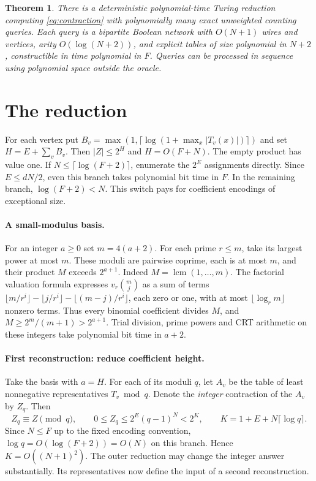 \documentclass[11pt]{article}
\newtheorem{theorem}{Theorem}
\begin{document}
\begin{theorem}\label{thm:reduction}
There is a deterministic polynomial-time Turing reduction computing \eqref{eq:contraction} with polynomially many exact unweighted counting queries. Each query is a bipartite Boolean network with $O(N+1)$ wires and vertices, arity $O(\log(N+2))$, and explicit tables of size polynomial in $N+2$, constructible in time polynomial in $F$. Queries can be processed in sequence using polynomial space outside the oracle.
\end{theorem}

\section{The reduction}
For each vertex put $B_v=\max(1,\lceil\log(1+\max_x |T_v(x)|)\rceil)$ and set $H=E+\sum_v B_v$. Then $|Z|\le 2^H$ and $H=O(F+N)$. The empty product has value one. If $N\le\lceil\log(F+2)\rceil$, enumerate the $2^E$ assignments directly. Since $E\le dN/2$, even this branch takes polynomial bit time in $F$. In the remaining branch, $\log(F+2)<N$. This switch pays for coefficient encodings of exceptional size.

\paragraph{A small-modulus basis.}
For an integer $a\ge 0$ set $m=4(a+2)$. For each prime $r\le m$, take its largest power at most $m$. These moduli are pairwise coprime, each is at most $m$, and their product $M$ exceeds $2^{a+1}$. Indeed $M=\operatorname{lcm}(1,\ldots,m)$. The factorial valuation formula expresses $v_r {m\choose j}$ as a sum of terms $\lfloor m/r^i\rfloor-\lfloor j/r^i\rfloor-\lfloor(m-j)/r^i\rfloor$, each zero or one, with at most $\lfloor\log_r m\rfloor$ nonzero terms. Thus every binomial coefficient divides $M$, and $M\ge 2^m/(m+1)>2^{a+1}$. Trial division, prime powers and CRT arithmetic on these integers take polynomial bit time in $a+2$.

\paragraph{First reconstruction: reduce coefficient height.}
Take the basis with $a=H$. For each of its moduli $q$, let $A_v$ be the table of least nonnegative representatives $T_v\bmod q$. Denote the \emph{integer} contraction of the $A_v$ by $Z_q$. Then
\[
 Z_q\equiv Z\pmod q,\qquad 0\le Z_q\le 2^E(q-1)^N < 2^{K},
 \qquad K=1+E+N\lceil\log q\rceil .
\]
Since $N\le F$ up to the fixed encoding convention, $\log q=O(\log(F+2))=O(N)$ on this branch. Hence $K=O((N+1)^2)$. The outer reduction may change the integer answer substantially. Its representatives now define the input of a second reconstruction.
\end{document}
